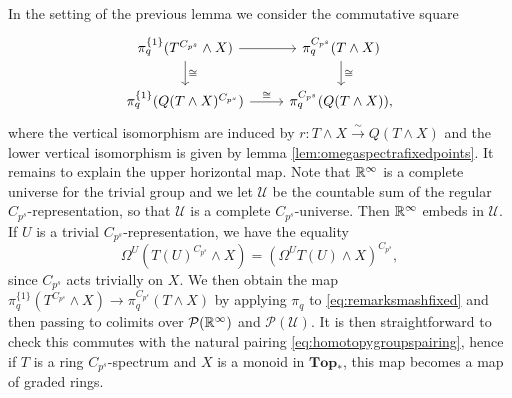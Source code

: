 \begin{rem}\label{rem:smashfixed}
In the setting of the previous lemma we consider the commutative square
\[
\begin{tikzcd}
\pi_q^{\{1\}}(T^{C_{p^s}}\wedge X)
\arrow{r}\arrow{d}{\cong}
&\pi_q^{C_{p^s}}(T\wedge X)
\arrow{d}{\cong}\\
\pi_q^{\{1\}}(Q(T\wedge X)^{C_{p^s}})
\arrow{r}{\cong}
&\pi_q^{C_{p^s}}(Q(T\wedge X)),
\end{tikzcd}
\]
where the vertical isomorphism are induced by
$r:T\wedge X\xrightarrow{\sim} Q(T\wedge X)$
and the lower vertical isomorphism is given by
lemma \ref{lem:omegaspectrafixedpoints}. It remains
to explain the upper horizontal map. Note that $\mathbb{R}^\infty$
is a complete universe for the trivial group
and we let $\mathcal{U}$ be the countable sum of the
regular $C_{p^s}$-representation, so that $\mathcal{U}$
is a complete $C_{p^s}$-universe. Then $\mathbb{R}^\infty$ embeds in 
$\mathcal{U}$. If $U$ is a trivial $C_{p^s}$-representation,
we have the equality
\begin{equation}\label{eq:remarksmashfixed}
\Omega^U(T(U)^{C_{p^s}}\wedge X) = (\Omega^UT(U)\wedge X)^{C_{p^s}},
\end{equation}
since $C_{p^s}$ acts trivially on $X$. We then obtain the map
$\pi_q^{\{1\}}(T^{C_{p^s}}\wedge X)
\to
\pi_q^{C_{p^s}}(T\wedge X)$ by applying $\pi_q$ to \eqref{eq:remarksmashfixed}
and then passing to colimits over $\mathcal{P}(\mathbb{R}^\infty)$ and $\mathcal{P}(\mathcal{U})$.
It is then straightforward to check this commutes with the natural pairing
\eqref{eq:homotopygroupspairing}, hence if $T$ is a ring $C_{p^s}$-spectrum and $X$ is a monoid
in $\mathbf{Top}_\ast$, this map becomes a map of graded rings.
\end{rem}


%

